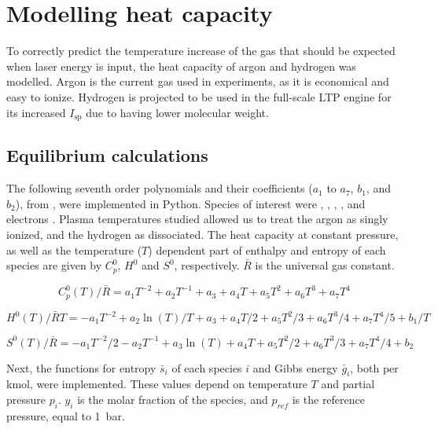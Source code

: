 \chapter{Modelling heat capacity} \label{chp:models}

    To correctly predict the temperature increase of the gas that should be expected when laser energy is input, the heat capacity of argon and hydrogen was modelled. Argon is the current gas used in experiments, as it is economical and easy to ionize. Hydrogen is projected to be used in the full-scale LTP engine for its increased $I_\mathrm{sp}$ due to having lower molecular weight.

    \section{Equilibrium calculations} \label{sec:equilibrium calcs}
        
        The following seventh order polynomials and their coefficients ($a_1$ to $a_7$, $b_1$, and $b_2$), from \textcite{mcbrideNASAGlennCoefficients2002}, were implemented in Python. Species of interest were , , , , and electrons . Plasma temperatures studied allowed us to treat the argon as singly ionized, and the hydrogen as dissociated. The heat capacity at constant pressure, as well as the temperature ($T$) dependent part of enthalpy and entropy of each species are given by $C_p^0$, $H^0$ and $S^0$, respectively. $\bar R$ is the universal gas constant.

        \begin{equation}
            C_p^0 (T)/\bar R = a_1 T^{-2} + a_2 T^{-1} + a_3 + a_4   T + a_5 T^2 + a_6 T^3 + a_7 T^4
        \end{equation} 
        
        \begin{equation}
            H^0 (T)/\bar RT = -a_1 T^{-2} + a_2 \ln(T)/T + a_3 + a_4 T / 2 + a_5 {T^2}/3 + a_6 {T^3}/4 + a_7 {T^4}/5 + b_1/T
        \end{equation}
        
        \begin{equation}
            S^0(T)/\bar R = -a_1 T^{-2}/2 - a_2 T^{-1} + a_3\ln(T) + a_4   T + a_5 {T^2}/2 + a_6 T^3/3 + a_7 T^4/4 + b_2
        \end{equation}

        Next, the functions for entropy $\bar s_i$ of each species $i$ and Gibbs energy $\bar g_i$, both per \unit{kmol}, were implemented. These values depend on temperature $T$ and partial pressure $p_i$. $y_i$ is the molar fraction of the species, and $p_{ref}$ is the reference pressure, equal to \qty{1}{bar}.
        
